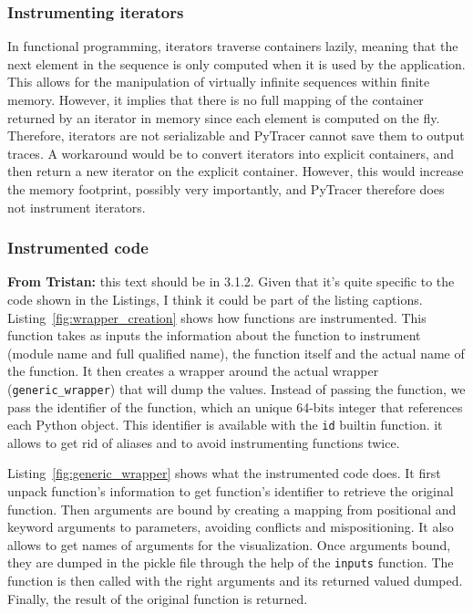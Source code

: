 \documentclass[11pt]{article}
\newcommand{\tristan}[1]{\color{orange}\textbf{From Tristan:} #1\color{black}\xspace}
\newcommand{\pytracer}[0]{PyTracer\xspace}
\begin{document}
\subsubsection{Instrumenting iterators}

In functional programming, iterators traverse containers lazily, meaning that the next element in the sequence is only computed when it is used by the application. This allows for the manipulation of virtually infinite sequences within finite memory. However, it implies that there is no full mapping of the container returned by an iterator in memory since each element is computed on the fly. Therefore, iterators are not serializable and \pytracer cannot save them to output traces. 
A workaround would be to convert iterators into explicit containers, and then return a new iterator on the explicit container. However, this would increase the memory footprint, possibly very importantly, and \pytracer therefore does not instrument iterators.

\subsubsection{Instrumented code}
\tristan{this text should be in 3.1.2. Given that it's quite specific to the code shown in the Listings, I think it could be part of the listing captions. }
Listing~\ref{fig:wrapper_creation} shows how functions are instrumented.
This function takes as inputs the information about the function to instrument (module name and full qualified name),
the function itself and the actual name of the function. It then creates a wrapper around the actual wrapper
(\texttt{generic\_wrapper}) that will dump the values. Instead of passing the function, we pass the identifier of 
the function, which an unique 64-bits integer that references each Python object. This identifier is available
with the \texttt{id} builtin function. it allows to get rid of aliases and to avoid instrumenting functions twice. 

Listing~\ref{fig:generic_wrapper} shows what the instrumented code does. 
It first unpack function's information to get function's identifier to retrieve the original function.
Then arguments are bound by creating a mapping from positional and keyword arguments to parameters, avoiding 
conflicts and mispositioning. It also allows to get names of arguments for the visualization.
Once arguments bound, they are dumped in the pickle file through the help of the \texttt{inputs} function.
The function is then called with the right arguments and its returned valued dumped.
Finally, the result of the original function is returned.
\end{document}
